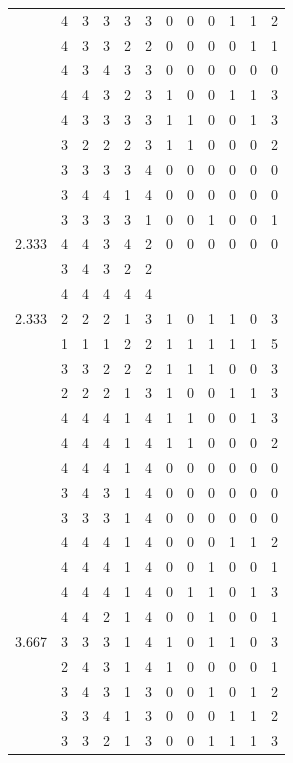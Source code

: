 \documentclass[]{msu-thesis}
\theoremstyle{definition}
\theoremstyle{definition}
\theoremstyle{definition}
\theoremstyle{remark}
\begin{document}
\begin{table}
{\begin{tabular}[t]{rrrrrrrrrrrr}
 & 4 & 3 & 3 & 3 & 3 & 0 & 0 & 0 & 1 & 1 & 2\\
 & 4 & 3 & 3 & 2 & 2 & 0 & 0 & 0 & 0 & 1 & 1\\
 & 4 & 3 & 4 & 3 & 3 & 0 & 0 & 0 & 0 & 0 & 0\\
 & 4 & 4 & 3 & 2 & 3 & 1 & 0 & 0 & 1 & 1 & 3\\
 & 4 & 3 & 3 & 3 & 3 & 1 & 1 & 0 & 0 & 1 & 3\\
 & 3 & 2 & 2 & 2 & 3 & 1 & 1 & 0 & 0 & 0 & 2\\
 & 3 & 3 & 3 & 3 & 4 & 0 & 0 & 0 & 0 & 0 & 0\\
 & 3 & 4 & 4 & 1 & 4 & 0 & 0 & 0 & 0 & 0 & 0\\
 & 3 & 3 & 3 & 3 & 1 & 0 & 0 & 1 & 0 & 0 & 1\\
2.333 & 4 & 4 & 3 & 4 & 2 & 0 & 0 & 0 & 0 & 0 & 0\\
 & 3 & 4 & 3 & 2 & 2 &  &  &  &  &  & \\
 & 4 & 4 & 4 & 4 & 4 &  &  &  &  &  & \\
2.333 & 2 & 2 & 2 & 1 & 3 & 1 & 0 & 1 & 1 & 0 & 3\\
 & 1 & 1 & 1 & 2 & 2 & 1 & 1 & 1 & 1 & 1 & 5\\
 & 3 & 3 & 2 & 2 & 2 & 1 & 1 & 1 & 0 & 0 & 3\\
 & 2 & 2 & 2 & 1 & 3 & 1 & 0 & 0 & 1 & 1 & 3\\
 & 4 & 4 & 4 & 1 & 4 & 1 & 1 & 0 & 0 & 1 & 3\\
 & 4 & 4 & 4 & 1 & 4 & 1 & 1 & 0 & 0 & 0 & 2\\
 & 4 & 4 & 4 & 1 & 4 & 0 & 0 & 0 & 0 & 0 & 0\\
 & 3 & 4 & 3 & 1 & 4 & 0 & 0 & 0 & 0 & 0 & 0\\
 & 3 & 3 & 3 & 1 & 4 & 0 & 0 & 0 & 0 & 0 & 0\\
 & 4 & 4 & 4 & 1 & 4 & 0 & 0 & 0 & 1 & 1 & 2\\
 & 4 & 4 & 4 & 1 & 4 & 0 & 0 & 1 & 0 & 0 & 1\\
 & 4 & 4 & 4 & 1 & 4 & 0 & 1 & 1 & 0 & 1 & 3\\
 & 4 & 4 & 2 & 1 & 4 & 0 & 0 & 1 & 0 & 0 & 1\\
3.667 & 3 & 3 & 3 & 1 & 4 & 1 & 0 & 1 & 1 & 0 & 3\\
 & 2 & 4 & 3 & 1 & 4 & 1 & 0 & 0 & 0 & 0 & 1\\
 & 3 & 4 & 3 & 1 & 3 & 0 & 0 & 1 & 0 & 1 & 2\\
 & 3 & 3 & 4 & 1 & 3 & 0 & 0 & 0 & 1 & 1 & 2\\
 & 3 & 3 & 2 & 1 & 3 & 0 & 0 & 1 & 1 & 1 & 3\\

\end{tabular}}
\end{table}
\end{document}
